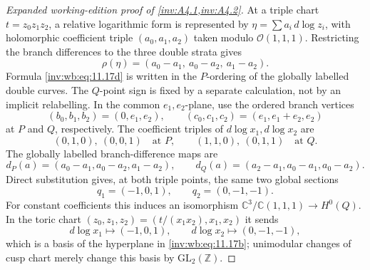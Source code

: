 \begin{proof}[Expanded working-edition proof of \cref{inv:A4.1,inv:A4.2}]
At a triple chart $t=z_0z_1z_2$, a relative logarithmic form is represented
by $\eta=\sum a_i\,d\log z_i$, with holomorphic coefficient triple
$(a_0,a_1,a_2)$ taken modulo $\mathcal O(1,1,1)$.  Restricting the branch
differences to the three double strata gives
\[
 \rho(\eta)=(a_0-a_1,\ a_0-a_2,\ a_1-a_2).
\tag{WBH.11.17d}\label{inv:wb:eq:11.17d}
\]
Formula \eqref{inv:wb:eq:11.17d} is written in the $P$-ordering of the globally labelled
double curves.  The $Q$-point sign is fixed by a separate calculation, not by
an implicit relabelling.  In the common $e_1,e_2$-plane, use the ordered
branch vertices
\[
 (b_0,b_1,b_2)=(0,e_1,e_2),\qquad
 (c_0,c_1,c_2)=(e_1,e_1+e_2,e_2)
\]
at $P$ and $Q$, respectively.  The coefficient triples of
$d\log x_1,d\log x_2$ are
\[
 (0,1,0),\ (0,0,1)\quad\text{at }P,
 \qquad
 (1,1,0),\ (0,1,1)\quad\text{at }Q.
\]
The globally labelled branch-difference maps are
\[
 d_P(a)=(a_0-a_1,a_0-a_2,a_1-a_2),
 \qquad
 d_Q(a)=(a_2-a_1,a_0-a_1,a_0-a_2).
\tag{WBH.11.17d$'$}\label{inv:wb:eq:11.17d-prime}
\]
Direct substitution gives, at both triple points, the same two global
sections
\[
 q_1=(-1,0,1),\qquad q_2=(0,-1,-1).
\tag{WBH.11.17d$''$}\label{inv:wb:eq:11.17d-doubleprime}
\]
For constant coefficients this induces an isomorphism
$\mathbb C^3/\mathbb C(1,1,1)\to H^0(Q)$.  In the toric chart
$(z_0,z_1,z_2)=(t/(x_1x_2),x_1,x_2)$ it sends
\[
 d\log x_1\longmapsto(-1,0,1),\qquad
 d\log x_2\longmapsto(0,-1,-1),
\]
which is a basis of the hyperplane in \eqref{inv:wb:eq:11.17b}; unimodular changes of cusp
chart merely change this basis by $\mathrm{GL}_2(\mathbb Z)$.


\end{proof}
